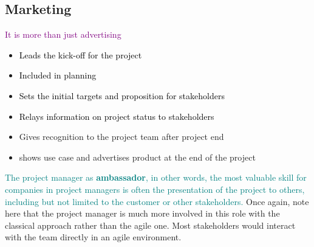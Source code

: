\documentclass[main.tex,fontsize=12pt,paper=a4,paper=landscape,DIV=calc,]{scrartcl}
\begin{document}
\begin{multicols*}{2}
\subsection{Marketing}
\textcolor{purple}{It is more than just advertising}\newline
\begin{itemize}
\item \textcolor{black}{Leads the kick-off for the project}
\item \textcolor{black}{Included in planning}
\item \textcolor{black}{Sets the initial targets and proposition for stakeholders}
\item \textcolor{black}{Relays information on project status to stakeholders}
\item Gives recognition to the project team after project end 
\item shows use case and advertises product at the end of the project
\end{itemize} 
\textcolor{teal}{The project manager as \textbf{ambassador}, in other words, the most valuable skill for companies in project managers is often the presentation of the project to others, including but not limited to the customer or other stakeholders.}\newline
Once again, note here that the project manager is much more involved in this role with the classical approach rather than the agile one.\newline
Most stakeholders would interact with the team directly in an agile environment. 


\end{multicols*}
\end{document}
